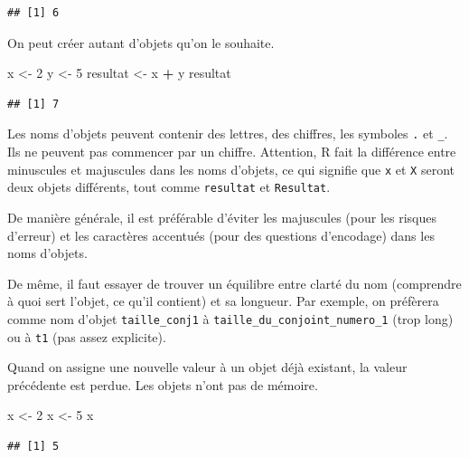 \documentclass[
  12pt,
]{book}
\makeatletter
\newenvironment{Shaded}{\begin{snugshade}}{\end{snugshade}}
\newcommand{\DecValTok}[1]{\textcolor[rgb]{0.00,0.00,0.81}{#1}}
\newcommand{\NormalTok}[1]{#1}
\newcommand{\OperatorTok}[1]{\textcolor[rgb]{0.81,0.36,0.00}{\textbf{#1}}}
\newcommand{\StringTok}[1]{\textcolor[rgb]{0.31,0.60,0.02}{#1}}
\newenvironment{kframe}{%
\medskip{}
\setlength{\fboxsep}{.8em}
\def\at@end@of@kframe{}%
\ifinner\ifhmode%
 \def\at@end@of@kframe{\end{minipage}}%
 \begin{minipage}{\columnwidth}%
\fi\fi%
\def\FrameCommand##1{\hskip\@totalleftmargin \hskip-\fboxsep
\colorbox{incolor}{##1}\hskip-\fboxsep
    \hskip-\linewidth \hskip-\@totalleftmargin \hskip\columnwidth}%
\MakeFramed {\advance\hsize-\width
  \@totalleftmargin\z@ \linewidth\hsize
  \@setminipage}}%
{\par\unskip\endMakeFramed%
\at@end@of@kframe}
\newenvironment{rmdblock}[1]
 {
 \begin{itemize}
 \renewcommand{\labelitemi}{
   \raisebox{-.7\height}[0pt][0pt]{
     {\setkeys{Gin}{width=3em,keepaspectratio}\texttt{[image: images/\#1]}}
   }
 }
 \begin{kframe}
 \setlength{\fboxsep}{1em}
 \item
 }
 {
 \end{kframe}
 \end{itemize}
 }
\newenvironment{rmdimportant}
  {\begin{rmdblock}{important}}
  {\end{rmdblock}}
\makeatother
\begin{document}
\begin{verbatim}
## [1] 6
\end{verbatim}

On peut créer autant d'objets qu'on le souhaite.

\begin{Shaded}
\begin{Highlighting}[]
\NormalTok{x \textless{}{-}}\StringTok{ }\DecValTok{2}
\NormalTok{y \textless{}{-}}\StringTok{ }\DecValTok{5}
\NormalTok{resultat \textless{}{-}}\StringTok{ }\NormalTok{x }\OperatorTok{+}\StringTok{ }\NormalTok{y}
\NormalTok{resultat}
\end{Highlighting}
\end{Shaded}

\begin{verbatim}
## [1] 7
\end{verbatim}

\begin{rmdimportant}
Les noms d'objets peuvent contenir des lettres, des chiffres, les symboles \texttt{.} et \texttt{\_}. Ils ne peuvent pas commencer par un chiffre. Attention, R fait la différence entre minuscules et majuscules dans les noms d'objets, ce qui signifie que \texttt{x} et \texttt{X} seront deux objets différents, tout comme \texttt{resultat} et \texttt{Resultat}.

De manière générale, il est préférable d'éviter les majuscules (pour les risques d'erreur) et les caractères accentués (pour des questions d'encodage) dans les noms d'objets.

De même, il faut essayer de trouver un équilibre entre clarté du nom (comprendre à quoi sert l'objet, ce qu'il contient) et sa longueur. Par exemple, on préfèrera comme nom d'objet \texttt{taille\_conj1} à \texttt{taille\_du\_conjoint\_numero\_1} (trop long) ou à \texttt{t1} (pas assez explicite).
\end{rmdimportant}

Quand on assigne une nouvelle valeur à un objet déjà existant, la valeur précédente est perdue. Les objets n'ont pas de mémoire.

\begin{Shaded}
\begin{Highlighting}[]
\NormalTok{x \textless{}{-}}\StringTok{ }\DecValTok{2}
\NormalTok{x \textless{}{-}}\StringTok{ }\DecValTok{5}
\NormalTok{x}
\end{Highlighting}
\end{Shaded}

\begin{verbatim}
## [1] 5
\end{verbatim}
\end{document}
